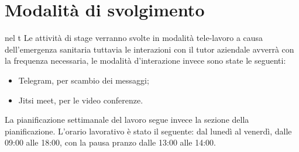 \section{Modalità di svolgimento}\label{sec:modalita-di-svolgimento}
nel t
Le attività di stage verranno svolte in modalità tele-lavoro a causa dell'emergenza sanitaria tuttavia le interazioni con il tutor aziendale avverrà con la frequenza necessaria, le modalità d'interazione invece sono state le seguenti:
\begin{itemize}
    \item Telegram, per scambio dei messaggi;
    \item Jitsi meet, per le video conferenze.
\end{itemize}
La pianificazione settimanale del lavoro segue invece la sezione della pianificazione.
L'orario lavorativo è stato il seguente: dal lunedì al venerdì, dalle 09:00 alle 18:00, con la pausa pranzo dalle 13:00 alle 14:00.